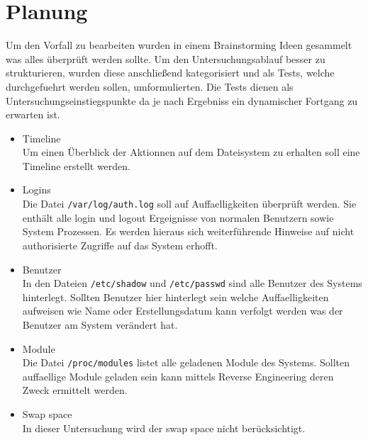 \section{Planung}
Um den Vorfall zu bearbeiten wurden in einem Brainstorming Ideen gesammelt was alles überprüft werden sollte. Um den Untersuchungsablauf besser zu strukturieren, wurden diese anschließend kategorisiert und als Tests, welche durchgefuehrt werden sollen, umformulierten. Die Tests dienen als Untersuchungseinstiegspunkte da je nach Ergebniss ein dynamischer Fortgang zu erwarten ist.

\begin{itemize}
\item Timeline\\
Um einen Überblick der Aktionnen auf dem Dateisystem zu erhalten soll eine Timeline erstellt werden.

\item Logins\\
Die Datei \texttt{/var/log/auth.log} soll auf Auffaelligkeiten überprüft werden. Sie enthält alle login und logout Ergeignisse von normalen Benutzern sowie System Prozessen. 
Es werden hieraus sich weiterführende Hinweise auf nicht authorisierte Zugriffe auf das System erhofft.

\item Benutzer\\
In den Dateien \texttt{/etc/shadow} und \texttt{/etc/passwd} sind alle Benutzer des Systems hinterlegt. Sollten Benutzer hier hinterlegt sein welche Auffaelligkeiten aufweisen wie Name oder Erstellungsdatum kann verfolgt werden was der Benutzer am System verändert hat.

\item Module\\
Die Datei \texttt{/proc/modules} listet alle geladenen Module des Systems. Sollten auffaellige Module geladen sein kann mittels Reverse Engineering deren Zweck ermittelt werden.

\item Swap space\\
In dieser Untersuchung wird der swap space nicht berücksichtigt.
\end{itemize}